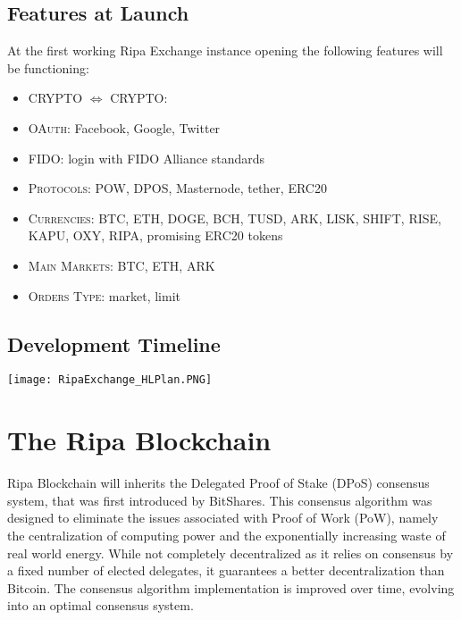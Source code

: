 \documentclass[11pt,fleqn,oneside]{book} %
\begin{document}
\subsection{Features at Launch}
At the first working Ripa Exchange instance opening the following features will be functioning:
\begin{itemize}
	\item \textsc{CRYPTO $\Leftrightarrow$ CRYPTO}:
	\item \textsc{OAuth}: Facebook, Google, Twitter
	\item \textsc{FIDO}: login with FIDO Alliance standards
	\item \textsc{Protocols}: POW, DPOS, Masternode, tether, ERC20
	\item \textsc{Currencies}: BTC, ETH, DOGE, BCH, TUSD, ARK, LISK, SHIFT, RISE, KAPU, OXY, RIPA, promising ERC20 tokens
	\item \textsc{Main Markets}: BTC, ETH, ARK
	\item \textsc{Orders Type}: market, limit
\end{itemize}

\subsection{Development Timeline}
\begin{center}
	\texttt{[image: RipaExchange\_HLPlan.PNG]}
\end{center}

\section{The Ripa Blockchain}
\label{sec:theRipaBlockchain}
Ripa Blockchain will inherits the Delegated Proof of Stake (DPoS) consensus system, that was first
introduced by BitShares. This consensus algorithm was designed to eliminate the issues associated
with Proof of Work (PoW), namely the centralization of computing power and the exponentially
increasing waste of real world energy. While not completely decentralized as it relies on consensus
by a fixed number of elected delegates, it guarantees a better decentralization than Bitcoin. 
The consensus algorithm implementation is improved over time, evolving into an optimal consensus system.\\
\end{document}
